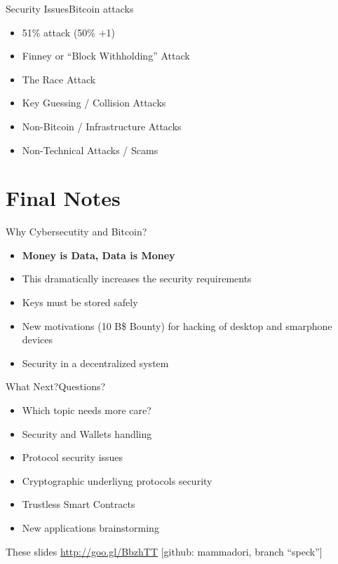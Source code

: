 \documentclass[english,compress]{beamer}
\begin{document}
\begin{frame}{Security Issues}{Bitcoin attacks}
\begin{itemize}
 \item 51\% attack (50\% +1)
 \item Finney or “Block Withholding” Attack
 \item The Race Attack
 \item Key Guessing / Collision Attacks
 \item Non-Bitcoin / Infrastructure Attacks
 \item Non-Technical Attacks / Scams
\end{itemize}
\end{frame}


\section{Final Notes}

\begin{frame}{Why Cybersecutity and Bitcoin?}
\begin{itemize}
  \item \textbf{Money is Data, Data is Money}
  \item This dramatically increases the security requirements
  \item Keys must be stored safely
  \item New motivations (10 B\$ Bounty) for hacking of desktop and smarphone devices
  \item Security in a decentralized system
 \end{itemize}
\end{frame}


\begin{frame}{What Next?}{Questions?}
 \begin{itemize}
  \item Which topic needs more care?
  \item Security and Wallets handling
  \item Protocol security issues
  \item Cryptographic underliyng protocols security
  \item Trustless Smart Contracts
  \item New applications brainstorming
 \end{itemize}
 
  \begin{block}{These slides}
  \url{http://goo.gl/BbzhTT} [github: mammadori, branch ``speck'']
  \end{block}

\end{frame}
\end{document}
